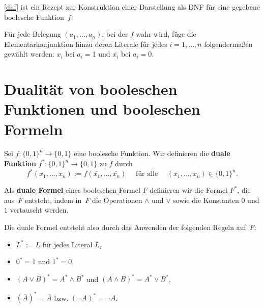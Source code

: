 \begin{bem} \label{dnf:rezept}
	\eqref{dnf} ist ein Rezept zur Konstruktion einer Darstellung als DNF für eine gegebene boolesche Funktion~$f$:
	
	 Für jede Belegung $(a_1,\ldots,a_n)$, bei der $f$ wahr wird, füge die Elementarkonjunktion hinzu deren Literale für jedes $i=1,\ldots,n$ folgendermaßen  gewählt werden: $x_i$ bei $a_i=1$ und $\overline{x_i}$ bei $a_i=0$. 
\end{bem} 


\section{Dualität von booleschen Funktionen und booleschen Formeln} 

\begin{defn}
	Sei $f : \{0,1\}^n \to \{0,1\}$ eine boolesche Funktion. Wir definieren die \textbf{duale Funktion} $f^\ast : \{0,1\}^n \to \{0,1\}$ zu $f$ durch 
	\[
	f^\ast(x_1,\ldots,x_n) := \overline{ f(\overline{x_1},\ldots,\overline{x_n})} \quad \text{ für alle } \quad (x_1,\ldots,x_n) \in \{0,1\}^n.
	\]
\end{defn} 


\begin{defn}
	Als \textbf{duale Formel} einer booleschen Formel $F$ definieren wir die Formel $F^\ast$, die aus~$F$ entsteht, indem in~$F$ die Operationen $\wedge$ und $\vee$ sowie die Konstanten $0$ und $1$ vertauscht werden.
	
	Die duale Formel entsteht also durch das Anwenden der folgenden Regeln auf~$F$:
	\begin{itemize} 
		\item $L^\ast := L$ für jedes Literal $L$,
		\item $0^\ast = 1$ und $1^\ast = 0$,
		\item $(A \vee B)^\ast = A^\ast \wedge B^\ast$ und $(A \wedge B)^\ast = A^\ast \vee B^\ast$,
		\item $(\overline{A})^\ast = \overline{A}$ bzw. $(\neg{A})^\ast = \neg{A}$.
	\end{itemize}  
\end{defn} 

